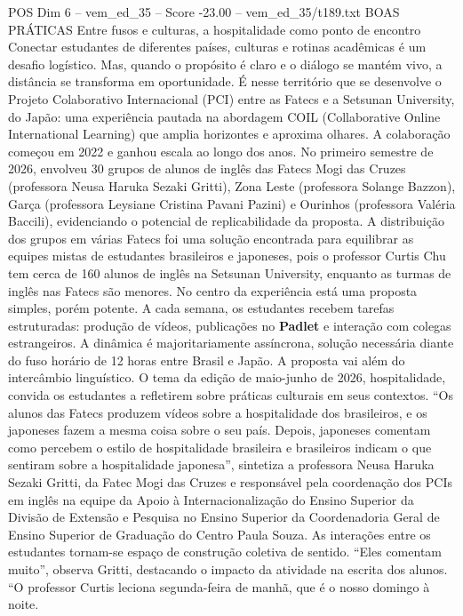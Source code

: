 \begin{textsample}{POS Dim 6 – vem\_ed\_35 – Score -23.00 – vem\_ed\_35/t189.txt}  \label{ex:f6_pos_156}
BOAS PRÁTICAS Entre fusos e culturas, a hospitalidade como ponto de encontro Conectar estudantes de diferentes países, culturas e rotinas acadêmicas é um desafio logístico.
Mas, quando o propósito é claro e o diálogo se mantém vivo, a distância se transforma em oportunidade.
É nesse território que se desenvolve o Projeto Colaborativo Internacional (PCI) entre as Fatecs e a Setsunan University, do Japão: uma experiência pautada na abordagem COIL (Collaborative Online International Learning) que amplia horizontes e aproxima olhares.
A colaboração começou em 2022 e ganhou escala ao longo dos anos.
No primeiro semestre de 2026, envolveu 30 grupos de alunos de inglês das Fatecs Mogi das Cruzes (professora Neusa Haruka Sezaki Gritti), Zona Leste (professora Solange Bazzon), Garça (professora Leysiane Cristina Pavani Pazini) e Ourinhos (professora Valéria Baccili), evidenciando o potencial de replicabilidade da proposta.
A distribuição dos grupos em várias Fatecs foi uma solução encontrada para equilibrar as equipes mistas de estudantes brasileiros e japoneses, pois o professor Curtis Chu tem cerca de 160 alunos de inglês na Setsunan University, enquanto as turmas de inglês nas Fatecs são menores.
No centro da experiência está uma proposta simples, porém potente.
A cada semana, os estudantes recebem tarefas estruturadas: produção de vídeos, publicações no \textbf{Padlet} e interação com colegas estrangeiros.
A dinâmica é majoritariamente assíncrona, solução necessária diante do fuso horário de 12 horas entre Brasil e Japão.
A proposta vai além do intercâmbio linguístico.
O tema da edição de maio-junho de 2026, hospitalidade, convida os estudantes a refletirem sobre práticas culturais em seus contextos. “Os alunos das Fatecs produzem vídeos sobre a hospitalidade dos brasileiros, e os japoneses fazem a mesma coisa sobre o seu país.
Depois, japoneses comentam como percebem o estilo de hospitalidade brasileira e brasileiros indicam o que sentiram sobre a hospitalidade japonesa”, sintetiza a professora Neusa Haruka Sezaki Gritti, da Fatec Mogi das Cruzes e responsável pela coordenação dos PCIs em inglês na equipe da Apoio à Internacionalização do Ensino Superior da Divisão de Extensão e Pesquisa no Ensino Superior da Coordenadoria Geral de Ensino Superior de Graduação do Centro Paula Souza.
As interações entre os estudantes tornam-se espaço de construção coletiva de sentido. “Eles comentam muito”, observa Gritti, destacando o impacto da atividade na escrita dos alunos. “O professor Curtis leciona segunda-feira de manhã, que é o nosso domingo à noite.

\end{textsample}
